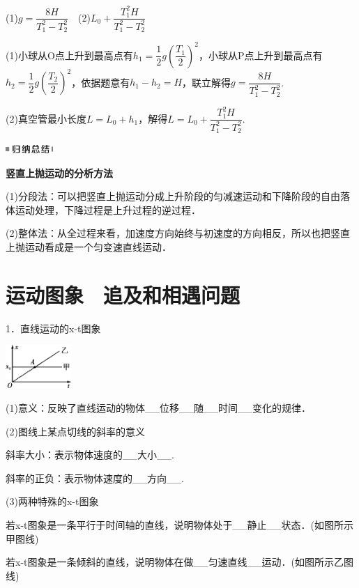 \begin{solution}
(1)$g=\dfrac{8H}{T_1^2-T_2^2}$　(2)$L_0+\dfrac{T_1^2H}{T_1^2-T_2^2}$

(1)小球从O点上升到最高点有$h_1=\dfrac{1}{2}g(\dfrac{T_1}{2} )^2$，小球从P点上升到最高点有$h_2=\dfrac{1}{2}g(\dfrac{T_2}{2} )^2$，依据题意有$h_1-h_2=H$，联立解得$g=\dfrac{8H}{T_1^2-T_2^2}$.

(2)真空管最小长度$L=L_0+h_1$，解得$L=L_0+\dfrac{T_1^2H}{T_1^2-T_2^2}$.


\end{solution}
\begin{center}\includegraphics[width=0.71319in,height=0.12986in]{media/image13.png}

\textbf{竖直上抛运动的分析方法}
\end{center}


(1)分段法：可以把竖直上抛运动分成上升阶段的匀减速运动和下降阶段的自由落体运动处理，下降过程是上升过程的逆过程．

(2)整体法：从全过程来看，加速度方向始终与初速度的方向相反，所以也把竖直上抛运动看成是一个匀变速直线运动．
\newpage
\section{运动图象　追及和相遇问题}



1．直线运动的x-t图象

\begin{center}\includegraphics[width=0.97917in,height=0.64583in]{media/image29.png}\end{center}

(1)意义：反映了直线运动的物体\_\_位移\_\_随\_\_时间\_\_变化的规律．

(2)图线上某点切线的斜率的意义

斜率大小：表示物体速度的\_\_大小\_\_.

斜率的正负：表示物体速度的\_\_方向\_\_.

(3)两种特殊的x-t图象

若x-t图象是一条平行于时间轴的直线，说明物体处于\_\_静止\_\_状态．(如图所示甲图线)

若x-t图象是一条倾斜的直线，说明物体在做\_\_匀速直线\_\_运动．(如图所示乙图线)

